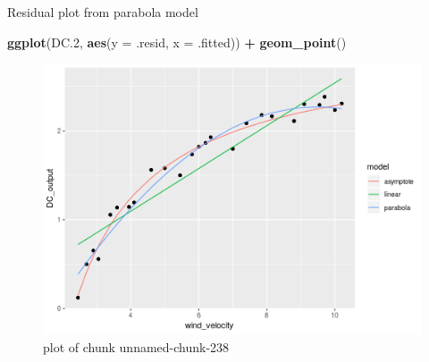 \documentclass[ignorenonframetext,]{beamer}
\newenvironment{Shaded}{\begin{snugshade}}{\end{snugshade}}
\newcommand{\DataTypeTok}[1]{\textcolor[rgb]{0.13,0.29,0.53}{#1}}
\newcommand{\FloatTok}[1]{\textcolor[rgb]{0.00,0.00,0.81}{#1}}
\newcommand{\KeywordTok}[1]{\textcolor[rgb]{0.13,0.29,0.53}{\textbf{#1}}}
\newcommand{\NormalTok}[1]{#1}
\newcommand{\OperatorTok}[1]{\textcolor[rgb]{0.81,0.36,0.00}{\textbf{#1}}}
\newcommand{\StringTok}[1]{\textcolor[rgb]{0.31,0.60,0.02}{#1}}
\begin{document}
\begin{frame}[fragile]{Residual plot from parabola model}
\protect\hypertarget{residual-plot-from-parabola-model}{}

\begin{Shaded}
\begin{Highlighting}[]
\KeywordTok{ggplot}\NormalTok{(DC}\FloatTok{.2}\NormalTok{, }\KeywordTok{aes}\NormalTok{(}\DataTypeTok{y =}\NormalTok{ .resid, }\DataTypeTok{x =}\NormalTok{ .fitted)) }\OperatorTok{+}
\StringTok{  }\KeywordTok{geom_point}\NormalTok{()}
\end{Highlighting}
\end{Shaded}

\begin{figure}
\centering
\includegraphics{figure/unnamed-chunk-238-1.png}
\caption{plot of chunk unnamed-chunk-238}
\end{figure}

\end{frame}
\end{document}
